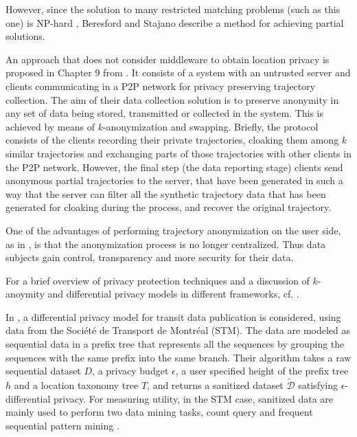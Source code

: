 \documentclass{llncs}
\begin{document}
However, since the solution to many restricted matching problems (such as this one) is NP-hard \cite{Tanimoto1978}, Beresford and Stajano \cite{Beresford04mixzones} describe a method for achieving partial solutions.


An approach that does not consider middleware to obtain location privacy is proposed in Chapter 9 from \cite{Gidofalvi2007}. It consists of a system with an untrusted server and clients communicating in a P2P network for privacy preserving trajectory collection. 
The aim of their data collection solution is to preserve anonymity in any set of data being stored, transmitted or
collected in the system. This is achieved by means of $k$-anonymization and swapping.
Briefly, the protocol consists of the clients recording their private trajectories, cloaking them among $k$ similar trajectories and exchanging parts of those trajectories with other clients in the P2P network. However, the final step (the data reporting stage) clients send anonymous partial trajectories to the server, that have been generated in such a way that the server can filter all the synthetic trajectory data that has been generated for cloaking during the process, and recover the original trajectory.

One of the advantages of performing trajectory anonymization on the user side, as in \cite{Romero-Tris2016}, is that the anonymization process is no longer centralized. Thus data subjects gain control, transparency and more security for their data.


For a brief overview of privacy protection techniques and a discussion of $k$-anoymity and differential privacy models in different frameworks, cf. \cite{Salas:2018}.


In \cite{Chen:2012}, a differential privacy model for transit data publication is considered, using data from the Soci\'{e}t\'{e} de Transport de Montr\'{e}al (STM). The data are modeled as sequential data in a prefix tree that represents all the sequences by grouping the sequences with the same prefix into the same branch. 
Their algorithm takes a raw sequential dataset $D$, a privacy budget $\epsilon$, a user specified height of the prefix tree $h$ and a location taxonomy tree $T$, and returns a sanitized dataset $\tilde{\mathcal{D}}$ satisfying $\epsilon$-differential privacy.
For measuring utility, in the STM case, sanitized data are mainly used to perform two
data mining tasks, count query and frequent sequential pattern mining \cite{Agrawal:1995}.
\end{document}
